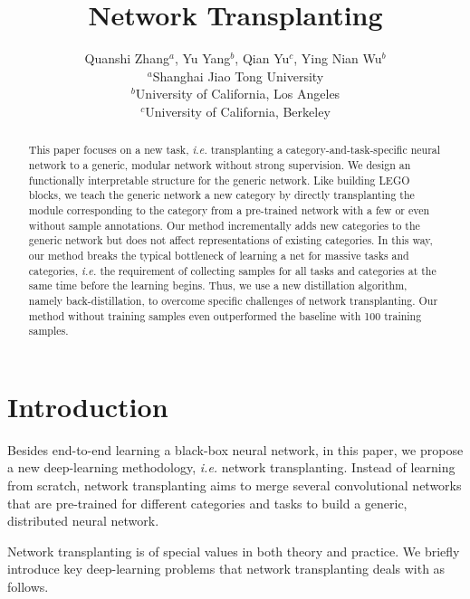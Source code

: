 \documentclass[10pt,twocolumn,letterpaper]{article}
\begin{document}
\title{Network Transplanting}

\author{Quanshi Zhang$^{a}$, Yu Yang$^{b}$, Qian Yu$^{c}$, Ying Nian Wu$^{b}$\\
$^{a}$Shanghai Jiao Tong University\\
$^{b}$University of California, Los Angeles\\
$^{c}$University of California, Berkeley\\
}


\maketitle

\begin{abstract}
This paper focuses on a new task, \emph{i.e.} transplanting a category-and-task-specific neural network to a generic, modular network without strong supervision. We design an functionally interpretable structure for the generic network. Like building LEGO blocks, we teach the generic network a new category by directly transplanting the module corresponding to the category from a pre-trained network with a few or even without sample annotations. Our method incrementally adds new categories to the generic network but does not affect representations of existing categories. In this way, our method breaks the typical bottleneck of learning a net for massive tasks and categories, \emph{i.e.} the requirement of collecting samples for all tasks and categories at the same time before the learning begins. Thus, we use a new distillation algorithm, namely back-distillation, to overcome specific challenges of network transplanting. Our method without training samples even outperformed the baseline with 100 training samples.
\end{abstract}


\section{Introduction}

Besides end-to-end learning a black-box neural network, in this paper, we propose a new deep-learning methodology, \emph{i.e.} network transplanting.
Instead of learning from scratch, network transplanting aims to merge several convolutional networks that are pre-trained for different categories and tasks to build a generic, distributed neural network.

Network transplanting is of special values in both theory and practice. We briefly introduce key deep-learning problems that network transplanting deals with as follows.
\end{document}
